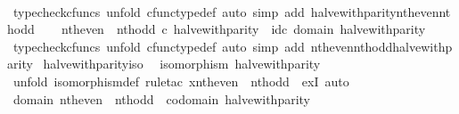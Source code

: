 \begin{isabellebody}
\ \ \ \ \isamarkupfalse%
\ {\isacharparenleft}{\kern0pt}typecheck{\isacharunderscore}{\kern0pt}cfuncs{\isacharcomma}{\kern0pt}\ unfold\ cfunc{\isacharunderscore}{\kern0pt}type{\isacharunderscore}{\kern0pt}def{\isacharcomma}{\kern0pt}\ auto\ simp\ add{\isacharcolon}{\kern0pt}\ halve{\isacharunderscore}{\kern0pt}with{\isacharunderscore}{\kern0pt}parity{\isacharunderscore}{\kern0pt}nth{\isacharunderscore}{\kern0pt}even{\isacharunderscore}{\kern0pt}nth{\isacharunderscore}{\kern0pt}odd{\isacharparenright}{\kern0pt}\isanewline
\ \ \isamarkupfalse%
\ {\isachardoublequoteopen}nth{\isacharunderscore}{\kern0pt}even\ {\isasymamalg}\ nth{\isacharunderscore}{\kern0pt}odd\ {\isasymcirc}\isactrlsub c\ halve{\isacharunderscore}{\kern0pt}with{\isacharunderscore}{\kern0pt}parity\ {\isacharequal}{\kern0pt}\ id\isactrlsub c\ {\isacharparenleft}{\kern0pt}domain\ halve{\isacharunderscore}{\kern0pt}with{\isacharunderscore}{\kern0pt}parity{\isacharparenright}{\kern0pt}{\isachardoublequoteclose}\isanewline
\ \ \ \ \isamarkupfalse%
\ {\isacharparenleft}{\kern0pt}typecheck{\isacharunderscore}{\kern0pt}cfuncs{\isacharcomma}{\kern0pt}\ unfold\ cfunc{\isacharunderscore}{\kern0pt}type{\isacharunderscore}{\kern0pt}def{\isacharcomma}{\kern0pt}\ auto\ simp\ add{\isacharcolon}{\kern0pt}\ nth{\isacharunderscore}{\kern0pt}even{\isacharunderscore}{\kern0pt}nth{\isacharunderscore}{\kern0pt}odd{\isacharunderscore}{\kern0pt}halve{\isacharunderscore}{\kern0pt}with{\isacharunderscore}{\kern0pt}parity{\isacharparenright}{\kern0pt}\isanewline
{}\isamarkupfalse%
%
\endisatagproof
{\isafoldproof}%
%
\isadelimproof
\isanewline
%
\endisadelimproof
\isanewline
{}\isamarkupfalse%
\ halve{\isacharunderscore}{\kern0pt}with{\isacharunderscore}{\kern0pt}parity{\isacharunderscore}{\kern0pt}iso{\isacharcolon}{\kern0pt}\isanewline
\ \ {\isachardoublequoteopen}isomorphism\ halve{\isacharunderscore}{\kern0pt}with{\isacharunderscore}{\kern0pt}parity{\isachardoublequoteclose}\isanewline
%
\isadelimproof
%
\endisadelimproof
%
\isatagproof
{}\isamarkupfalse%
\ {\isacharparenleft}{\kern0pt}unfold\ isomorphism{\isacharunderscore}{\kern0pt}def{\isacharcomma}{\kern0pt}\ rule{\isacharunderscore}{\kern0pt}tac\ x{\isacharequal}{\kern0pt}{\isachardoublequoteopen}nth{\isacharunderscore}{\kern0pt}even\ {\isasymamalg}\ nth{\isacharunderscore}{\kern0pt}odd{\isachardoublequoteclose}\ \ exI{\isacharcomma}{\kern0pt}\ auto{\isacharparenright}{\kern0pt}\isanewline
\ \ \isamarkupfalse%
\ {\isachardoublequoteopen}domain\ {\isacharparenleft}{\kern0pt}nth{\isacharunderscore}{\kern0pt}even\ {\isasymamalg}\ nth{\isacharunderscore}{\kern0pt}odd{\isacharparenright}{\kern0pt}\ {\isacharequal}{\kern0pt}\ codomain\ halve{\isacharunderscore}{\kern0pt}with{\isacharunderscore}{\kern0pt}parity{\isachardoublequoteclose}\isanewline

\end{isabellebody}

